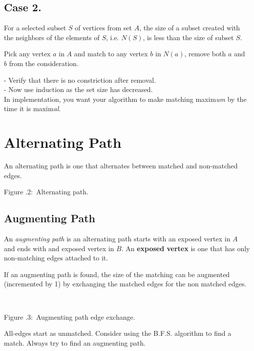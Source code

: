 \documentclass[twoside]{article}
\newcounter{lecnum}
\newcommand{\fig}[3]{
      \vspace{#2}
      \begin{center}
      Figure \thelecnum.#1:~#3
      \end{center}
  }
\begin{document}
\newpage
\noindent \subsection{Case 2.}
For a selected subset $S$ of vertices from set $A$, the size of a subset created with the neighbors of the elements of $S$, i.e. $N(S)$, is less than the size of subset $S$.

Pick any vertex $a$ in $A$ and match to any vertex $b$ in $N(a)$, remove both $a$ and $b$ from the consideration.

- Verify that there is no constriction after removal.\\
- Now use induction as the set size has decreased.\\

In implementation, you want your algorithm to make matching maxim\textit{um} by the time it is maxim\textit{al}.

\section{Alternating Path}

An alternating path is one that alternates between matched and non-matched edges.
\begin{center}
\end{center}
\fig{2}{0in}{Alternating path.}

\subsection{Augmenting Path}
An \textit{augmenting path} is an alternating path starts with an exposed vertex in $A$ and ends with and exposed vertex in $B$. An \textbf{exposed vertex} is one that has only non-matching edges attached to it.

If an augmenting path is found, the size of the matching can be augmented (incremented by 1) by exchanging the matched edges for the non matched edges.\\

\begin{center}
\\
\end{center}
\fig{3}{0in}{Augmenting path edge exchange.}
All-edges start as unmatched. Consider using the B.F.S. algorithm to find a match. Always try to find an augmenting path.
\end{document}
